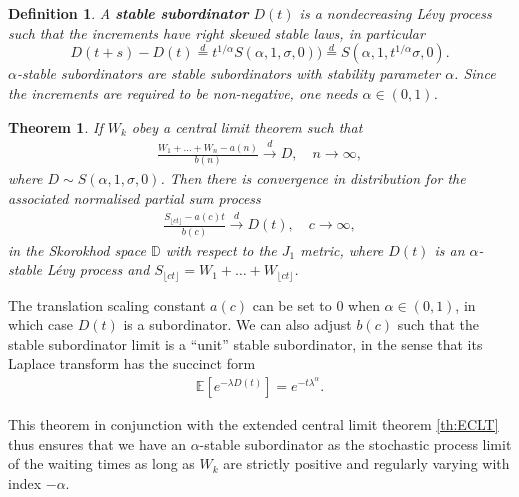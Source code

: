 \documentclass[honours,12pt]{unswthesis}
\newcommand{\E}{\mathbb{E}}
\newcommand{\1}{\mathbf 1}
\newcommand{\Floor}[1]{{\lfloor {#1} \rfloor}}
\newcommand{\cd}{\overset{d}{\longrightarrow}}
\newcommand{\D}{\mathbb{D}}
\newtheorem{theorem}[equation]{Theorem}
\newtheorem{definition}[equation]{Definition}
\numberwithin{equation}{section}
\theoremstyle{definition}
\theoremstyle{remark}
\begin{document}
\begin{definition}
A \textbf{stable subordinator} $D(t)$ is a nondecreasing L\'{e}vy process such that the increments have right skewed stable laws, in particular
\[
	D(t+s)-D(t)\overset{d}{=}t^{1/\alpha}S(\alpha,1,\sigma,0))\overset{d}{=}S(\alpha,1,t^{1/\alpha}\sigma,0).
\]
$\alpha$-stable subordinators are stable subordinators with stability parameter $\alpha$.
Since the increments are required to be non-negative, one needs $\alpha \in (0,1)$. 
\end{definition}
\begin{theorem}\cite[Th.~4.5.3]{Whitt2010}\label{th:sfclt} If $W_k$ obey a central limit theorem such that
\begin{align}\label{eq:sclt}
	\frac{W_1 + \ldots + W_n - a(n)}{b(n)} \overset{d}{\longrightarrow} D, \quad n \to \infty,
\end{align}
where $D\sim S(\alpha,1,\sigma,0)$. Then there is convergence in distribution for the associated normalised partial sum process
\begin{align}
\frac{S_\Floor{ct} - a(c)t}{b(c)} \cd D(t), \quad c \to \infty,
\end{align}
in the Skorokhod space $\D$ with respect to the $J_1$ metric, where $D(t)$ is an 
$\alpha$-stable L\'evy process and $S_\Floor{ct}=W_1 + \ldots + W_\Floor{ct}$.
\end{theorem}

The translation scaling constant $a(c)$ can be set to $0$ when $\alpha\in(0,1)$,
in which case $D(t)$ is a subordinator. We can also adjust $b(c)$ such that the stable subordinator limit is a ``unit'' stable subordinator, in the sense that its Laplace transform has the succinct form
\begin{align}\label{eq:unitStable}
\E[e^{-\lambda D(t)}] = e^{-t \lambda^\alpha}.
\end{align}

This theorem in conjunction with the extended central limit theorem \ref{th:ECLT} thus ensures that we have an $\alpha$-stable subordinator as the stochastic process limit of the waiting times as long as $W_k$ are strictly positive and regularly varying with index $-\alpha$.
\end{document}
